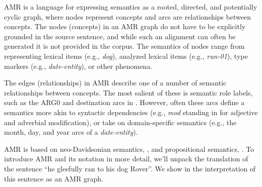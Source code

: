 \documentclass[11pt]{article}
\newcommand\w[1]{\textit{#1}} %
\begin{document}


AMR is a language for expressing semantics as a rooted, directed, and potentially cyclic graph, where nodes represent concepts and arcs are relationships between concepts.
The nodes (concepts) in an AMR graph do not have to be explicitly grounded in the source sentence, and while such an alignment can often be generated it is not provided in the corpus.
The semantics of nodes range from representing lexical items (e.g., \w{dog}), analyzed lexical items (e.g., \textit{run-01}), type markers (e.g., \textit{date-entity}), or other phenomena.

The edges (relationships) in AMR describe one of a number of semantic relationships between concepts.
The most salient of these is semantic role labels, such as the ARG0 and destination arcs in .
However, often these arcs define a semantics more akin to syntactic dependencies (e.g., \textit{mod} standing in for adjective and adverbial modification), or take on domain-specific semantics (e.g., the month, day, and year arcs of a \textit{date-entity}).

AMR is based on neo-Davidsonian semantics, \cite{Davidson:1967}, and propositional semantics, \cite{Parsons:1990}.
To introduce AMR and its notation in more detail, we'll unpack the translation of the sentence ``he gleefully ran to his dog Rover''. 
We show in  the interpretation of this sentence as an AMR graph.

\end{document}
